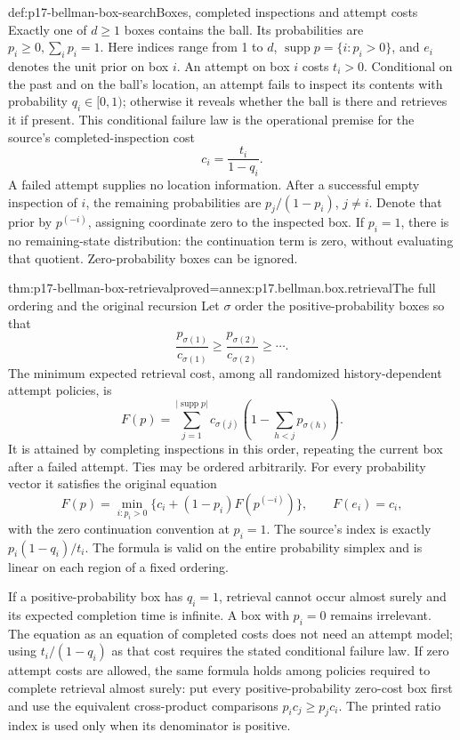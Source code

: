 \begin{hbdefinition}{def:p17-bellman-box-search}{Boxes, completed inspections and attempt costs}
Exactly one of \(d\geq1\) boxes contains the ball.
Its probabilities are \(p_i\geq0,\sum_i p_i=1\).
Here indices range from 1 to \(d\),
\(\operatorname{supp}p=\{i:p_i>0\}\), and \(e_i\)
denotes the unit prior on box \(i\).
An attempt on box \(i\) costs \(t_i>0\).
Conditional on the past and on the ball's location, an
attempt fails to inspect its contents with probability
\(q_i\in[0,1)\); otherwise it reveals whether the ball is
there and retrieves it if present.
This conditional failure law is the operational premise
for the source's completed-inspection cost
\[
                              c_i=\frac{t_i}{1-q_i}.
\]
A failed attempt supplies no location information.
After a successful empty inspection of \(i\), the
remaining probabilities are \(p_j/(1-p_i)\), \(j\ne i\).
Denote that prior by \(p^{(-i)}\), assigning coordinate
zero to the inspected box.
If \(p_i=1\), there is no remaining-state distribution:
the continuation term is zero, without evaluating that quotient.
Zero-probability boxes can be ignored.
\end{hbdefinition}

\begin{hbtheorem}{thm:p17-bellman-box-retrieval}{proved=annex:p17.bellman.box.retrieval}{The full ordering and the original recursion}
Let \(\sigma\) order the positive-probability boxes so that
\[
            \frac{p_{\sigma(1)}}{c_{\sigma(1)}}\geq
            \frac{p_{\sigma(2)}}{c_{\sigma(2)}}\geq\cdots .
\]
The minimum expected retrieval cost, among all randomized
history-dependent attempt policies, is
\[
 F(p)=\sum_{j=1}^{|\operatorname{supp}p|}
             c_{\sigma(j)}
                    \left(1-\sum_{h<j}p_{\sigma(h)}\right).
\]
It is attained by completing inspections in this order,
repeating the current box after a failed attempt.
Ties may be ordered arbitrarily.
For every probability vector it satisfies the original equation
\[
 F(p)=\min_{i:p_i>0}
           \{c_i+(1-p_i)F(p^{(-i)})\},\qquad F(e_i)=c_i,
\]
with the zero continuation convention at \(p_i=1\).
The source's index is exactly \(p_i(1-q_i)/t_i\).
The formula is valid on the entire probability simplex
and is linear on each region of a fixed ordering.

If a positive-probability box has \(q_i=1\), retrieval
cannot occur almost surely and its expected completion
time is infinite. A box with \(p_i=0\) remains irrelevant.
The equation as an equation of completed costs does not
need an attempt model; using \(t_i/(1-q_i)\) as that cost
requires the stated conditional failure law.
If zero attempt costs are allowed, the same formula holds
among policies required to complete retrieval almost surely:
put every positive-probability zero-cost box first and use
the equivalent cross-product comparisons \(p_ic_j\geq p_jc_i\).
The printed ratio index is used only when its denominator is positive.
\end{hbtheorem}

